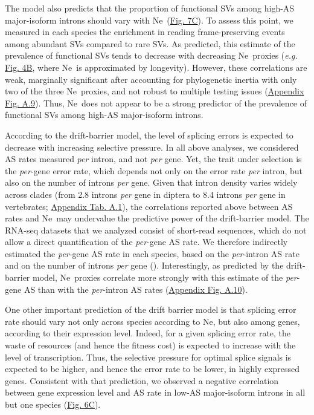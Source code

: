 The model also predicts that the proportion of functional \acrshort{SV}s among high-AS major-isoform introns should vary with \acrshort{Ne}~(\hyperref[fig:AS7]{Fig. 7C}). To assess this point, we measured in each species the enrichment in reading frame-preserving events among abundant \acrshort{SV}s compared to rare \acrshort{SV}s. As predicted, this estimate of the prevalence of functional \acrshort{SV}s tends to decrease with decreasing \acrshort{Ne}~proxies (\textit{e.g.} \hyperref[fig:AS4]{Fig. 4B}, where \acrshort{Ne}~is approximated by longevity). However, these correlations are weak, marginally significant after accounting for phylogenetic inertia with only two of the three \acrshort{Ne}~proxies, and not robust to multiple testing issues (\hyperref[supp_fig:AS9]{Appendix Fig. A.9}). Thus, \acrshort{Ne}~does not appear to be a strong predictor of the prevalence of functional \acrshort{SV}s among high-AS major-isoform introns.

According to the drift-barrier model, the level of splicing errors is expected to decrease with increasing selective pressure. In all above analyses, we considered AS rates measured \textit{per} intron, and not \textit{per} gene. Yet, the trait under selection is the \textit{per}-gene error rate, which depends not only on the error rate \textit{per} intron, but also on the number of introns \textit{per} gene. Given that intron density varies widely across clades (from 2.8 introns \textit{per} gene in diptera to 8.4 introns \textit{per} gene in vertebrates; \hyperref[table:1]{Appendix Tab. A.1}), the correlations reported above between AS rates and \acrshort{Ne}~may undervalue the predictive power of the drift-barrier model. The RNA-seq datasets that we analyzed consist of short-read sequences, which do not allow a direct quantification of the \textit{per}-gene AS rate. We therefore indirectly estimated the \textit{per}-gene AS rate in each species, based on the \textit{per}-intron AS rate and on the number of introns \textit{per} gene (). Interestingly, as predicted by the drift-barrier model, \acrshort{Ne}~proxies correlate more strongly with this estimate of the \textit{per}-gene AS than with the \textit{per}-intron AS rates (\hyperref[supp_fig:AS10]{Appendix Fig. A.10}). 

One other important prediction of the drift barrier model is that splicing error rate should vary not only across species according to \acrshort{Ne}, but also among genes, according to their expression level. Indeed, for a given splicing error rate, the waste of resources (and hence the fitness cost) is expected to increase with the level of transcription. Thus, the selective pressure for optimal splice signals is expected to be higher, and hence the error rate to be lower, in highly expressed genes. Consistent with that prediction, we observed a negative correlation between gene expression level and AS rate in low-AS major-isoform introns in all but one species (\hyperref[fig:AS6]{Fig. 6C}).

